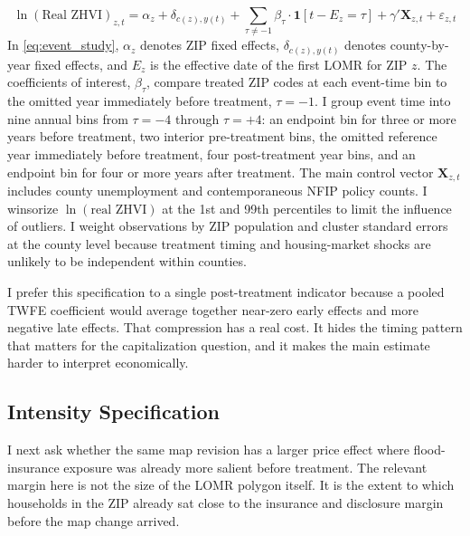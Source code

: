 \documentclass[12pt]{article}
\begin{document}
\begin{equation}\label{eq:event_study}
    \ln(\text{Real ZHVI})_{z,t} = \alpha_z + \delta_{c(z),y(t)} + \sum_{\tau \neq -1} \beta_\tau \cdot \mathbf{1}[t - E_z = \tau] + \gamma' \mathbf{X}_{z,t} + \varepsilon_{z,t}
\end{equation}
%
\noindent In \autoref{eq:event_study}, $\alpha_z$ denotes ZIP fixed effects, $\delta_{c(z),y(t)}$ denotes county-by-year fixed effects, and $E_z$ is the effective date of the first LOMR for ZIP $z$. The coefficients of interest, $\beta_\tau$, compare treated ZIP codes at each event-time bin to the omitted year immediately before treatment, $\tau = -1$. I group event time into nine annual bins from $\tau = -4$ through $\tau = +4$: an endpoint bin for three or more years before treatment, two interior pre-treatment bins, the omitted reference year immediately before treatment, four post-treatment year bins, and an endpoint bin for four or more years after treatment. The main control vector $\mathbf{X}_{z,t}$ includes county unemployment and contemporaneous NFIP policy counts. I winsorize $\ln(\text{real ZHVI})$ at the 1st and 99th percentiles to limit the influence of outliers. I weight observations by ZIP population and cluster standard errors at the county level because treatment timing and housing-market shocks are unlikely to be independent within counties.

I prefer this specification to a single post-treatment indicator because a pooled TWFE coefficient would average together near-zero early effects and more negative late effects. That compression has a real cost. It hides the timing pattern that matters for the capitalization question, and it makes the main estimate harder to interpret economically.

\subsection{Intensity Specification}\label{sec:strategy_intensity}

I next ask whether the same map revision has a larger price effect where flood-insurance exposure was already more salient before treatment. The relevant margin here is not the size of the LOMR polygon itself. It is the extent to which households in the ZIP already sat close to the insurance and disclosure margin before the map change arrived.
\end{document}
